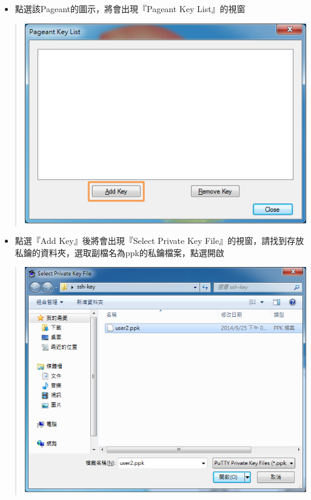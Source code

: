 \documentclass[letterpaper,10pt,english]{sphinxmanual}
\begin{document}
\begin{itemize}
\item {} 
點選該Pageant的圖示，將會出現『Pageant Key List』的視窗

\end{itemize}
\begin{quote}

\includegraphics{pageant-003.png}
\end{quote}
\begin{itemize}
\item {} 
點選『Add Key』後將會出現『Select Private Key File』的視窗，請找到存放私鑰的資料夾，選取副檔名為ppk的私鑰檔案，點選開啟

\end{itemize}
\begin{quote}

\includegraphics{pageant-004.png}
\end{quote}
\end{document}
